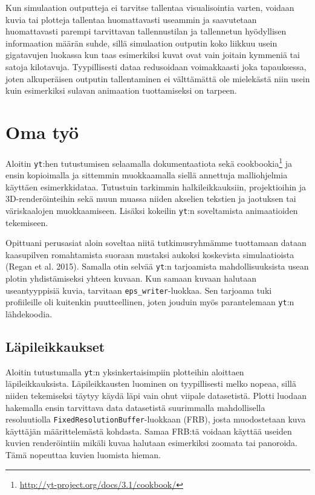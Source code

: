 \documentclass[12pt,a4paper]{article}
\newcommand{\yt}{\texttt{yt}}
\begin{document}
Kun simulaation outputteja ei tarvitse tallentaa visualisointia varten, voidaan kuvia tai plotteja tallentaa huomattavasti useammin ja saavutetaan huomattavasti parempi tarvittavan tallennustilan ja tallennetun hyödyllisen informaation määrän suhde, sillä simulaation outputin koko liikkuu usein gigatavujen luokassa kun taas esimerkiksi kuvat ovat vain joitain kymmeniä tai satoja kilotavuja. Tyypillisesti dataa redusoidaan voimakkaasti joka tapauksessa, joten alkuperäisen outputin tallentaminen ei välttämättä ole mielekästä niin usein kuin esimerkiksi sulavan animaation tuottamiseksi on tarpeen. \cite{yt}

\section{Oma työ}
Aloitin \yt :hen tutustumisen selaamalla dokumentaatiota sekä cookbookia\footnote{\url{http://yt-project.org/docs/3.1/cookbook/}} ja ensin kopioimalla ja sittemmin muokkaamalla siellä annettuja malliohjelmia käyttäen esimerkkidataa. Tutustuin tarkimmin halkileikkauksiin, projektioihin ja 3D-renderöinteihin sekä muun muassa niiden akselien tekstien ja jaotuksen tai väriskaalojen muokkaamiseen. Lisäksi kokeilin \yt :n soveltamista animaatioiden tekemiseen.

Opittuani perusasiat aloin soveltaa niitä tutkimusryhmämme tuottamaan dataan kaasupilven romahtamista suoraan mustaksi aukoksi koskevista simulaatioista (Regan et al. 2015). Samalla otin selvää \yt :n tarjoamista mahdollisuuksista usean plotin yhdistämiseksi yhteen kuvaan. Kun samaan kuvaan halutaan useantyyppisiä kuvia, tarvitaan \texttt{eps\_writer}-luokkaa. Sen tarjoama tuki profiileille oli kuitenkin puutteellinen, joten jouduin myös parantelemaan \yt :n lähdekoodia.

\subsection{Läpileikkaukset}
Aloitin tutustumalla \yt :n yksinkertaisimpiin plotteihin aloittaen läpileikkauksista. Läpi\-leikkausten luominen on tyypillisesti melko nopeaa, sillä niiden tekemiseksi täytyy käydä läpi vain ohut viipale datasetistä. Plotti luodaan hakemalla ensin tarvittava data datasetistä suurimmalla mahdollisella resoluutiolla \texttt{Fixed\-Resolution\-Buffer}-luokkaan (FRB), josta muodostetaan kuva käyttäjän määrittelemästä kohdasta. Samaa FRB:tä voidaan käyttää useiden kuvien renderöintiin mikäli kuvaa halutaan esimerkiksi zoomata tai panoroida. Tämä nopeuttaa kuvien luomista hieman. \cite{sliceproj}
\end{document}
